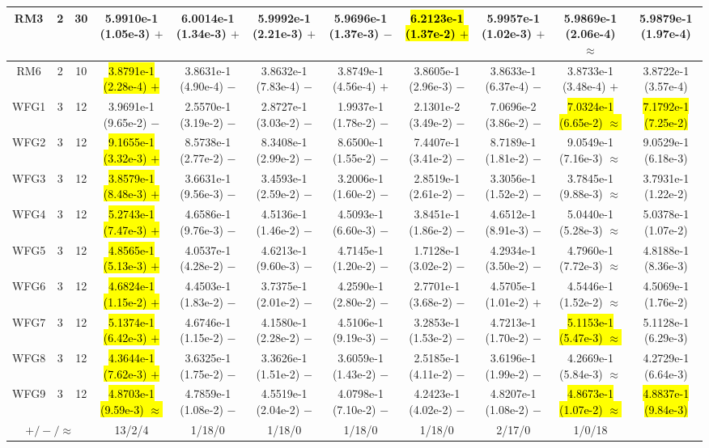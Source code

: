 \documentclass[journal]{IEEEtran}
\begin{document}
\begin{table*}[htbp]
\begin{tabular}{ccccccccccc}
\hline
\multirow{1}{*}{RM3}&2&30&5.9910e-1 (1.05e-3) $+$&6.0014e-1 (1.34e-3) $+$&5.9992e-1 (2.21e-3) $+$&5.9696e-1 (1.37e-3) $-$&\hl{6.2123e-1 (1.37e-2) $+$}&5.9957e-1 (1.02e-3) $+$&5.9869e-1 (2.06e-4) $\approx$&5.9879e-1 (1.97e-4)\\
\hline
\multirow{1}{*}{RM6}&2&10&\hl{3.8791e-1 (2.28e-4) $+$}&3.8631e-1 (4.90e-4) $-$&3.8632e-1 (7.83e-4) $-$&3.8749e-1 (4.56e-4) $+$&3.8605e-1 (2.96e-3) $-$&3.8633e-1 (6.37e-4) $-$&3.8733e-1 (3.48e-4) $+$&3.8722e-1 (3.57e-4)\\
\hline
\multirow{1}{*}{WFG1}&3&12&3.9691e-1 (9.65e-2) $-$&2.5570e-1 (3.19e-2) $-$&2.8727e-1 (3.03e-2) $-$&1.9937e-1 (1.78e-2) $-$&2.1301e-2 (3.49e-2) $-$&7.0696e-2 (3.86e-2) $-$&\hl{7.0324e-1 (6.65e-2) $\approx$}&\hl{7.1792e-1 (7.25e-2)}\\
\hline
\multirow{1}{*}{WFG2}&3&12&\hl{9.1655e-1 (3.32e-3) $+$}&8.5738e-1 (2.77e-2) $-$&8.3408e-1 (2.99e-2) $-$&8.6500e-1 (1.55e-2) $-$&7.4407e-1 (3.41e-2) $-$&8.7189e-1 (1.81e-2) $-$&9.0549e-1 (7.16e-3) $\approx$&9.0529e-1 (6.18e-3)\\
\hline
\multirow{1}{*}{WFG3}&3&12&\hl{3.8579e-1 (8.48e-3) $+$}&3.6631e-1 (9.56e-3) $-$&3.4593e-1 (2.59e-2) $-$&3.2006e-1 (1.60e-2) $-$&2.8519e-1 (2.61e-2) $-$&3.3056e-1 (1.52e-2) $-$&3.7845e-1 (9.88e-3) $\approx$&3.7931e-1 (1.22e-2)\\
\hline
\multirow{1}{*}{WFG4}&3&12&\hl{5.2743e-1 (7.47e-3) $+$}&4.6586e-1 (9.76e-3) $-$&4.5136e-1 (1.46e-2) $-$&4.5093e-1 (6.60e-3) $-$&3.8451e-1 (1.86e-2) $-$&4.6512e-1 (8.91e-3) $-$&5.0440e-1 (5.28e-3) $\approx$&5.0378e-1 (1.07e-2)\\
\hline
\multirow{1}{*}{WFG5}&3&12&\hl{4.8565e-1 (5.13e-3) $+$}&4.0537e-1 (4.28e-2) $-$&4.6213e-1 (9.60e-3) $-$&4.7145e-1 (1.20e-2) $-$&1.7128e-1 (3.02e-2) $-$&4.2934e-1 (3.50e-2) $-$&4.7960e-1 (7.72e-3) $\approx$&4.8188e-1 (8.36e-3)\\
\hline
\multirow{1}{*}{WFG6}&3&12&\hl{4.6824e-1 (1.15e-2) $+$}&4.4503e-1 (1.83e-2) $-$&3.7375e-1 (2.01e-2) $-$&4.2590e-1 (2.80e-2) $-$&2.7701e-1 (3.68e-2) $-$&4.5705e-1 (1.01e-2) $+$&4.5446e-1 (1.52e-2) $\approx$&4.5069e-1 (1.76e-2)\\
\hline
\multirow{1}{*}{WFG7}&3&12&\hl{5.1374e-1 (6.42e-3) $+$}&4.6746e-1 (1.15e-2) $-$&4.1580e-1 (2.28e-2) $-$&4.5106e-1 (9.19e-3) $-$&3.2853e-1 (1.53e-2) $-$&4.7213e-1 (1.70e-2) $-$&\hl{5.1153e-1 (5.47e-3) $\approx$}&5.1128e-1 (6.29e-3)\\
\hline
\multirow{1}{*}{WFG8}&3&12&\hl{4.3644e-1 (7.62e-3) $+$}&3.6325e-1 (1.75e-2) $-$&3.3626e-1 (1.51e-2) $-$&3.6059e-1 (1.43e-2) $-$&2.5185e-1 (4.11e-2) $-$&3.6196e-1 (1.99e-2) $-$&4.2669e-1 (5.84e-3) $\approx$&4.2729e-1 (6.64e-3)\\
\hline
\multirow{1}{*}{WFG9}&3&12&\hl{4.8703e-1 (9.59e-3) $\approx$}&4.7859e-1 (1.08e-2) $-$&4.5519e-1 (2.04e-2) $-$&4.0798e-1 (7.10e-2) $-$&4.2423e-1 (4.02e-2) $-$&4.8207e-1 (1.08e-2) $-$&\hl{4.8673e-1 (1.07e-2) $\approx$}&\hl{4.8837e-1 (9.84e-3)}\\
\hline
\multicolumn{3}{c}{$+/-/\approx$}&13/2/4&1/18/0&1/18/0&1/18/0&1/18/0&2/17/0&1/0/18&\\
\bottomrule
\end{tabular}
\label{No Label}
\end{table*}
\end{document}
